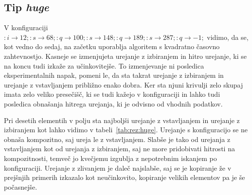 \documentclass[a4paper,oneside,12pt]{article}
\newcommand{\lra}{\ensuremath{\longrightarrow}}
\begin{document}
\subsection{Tip \emph{huge}}
V konfiguraciji $:i \lra 12;:s \lra 68;:q \lra 100;:s \lra 148;:q \lra 189;:s
\lra 287;:q \lra -1;$ vidimo, da se, kot vedno do sedaj, na začetku uporablja algoritem s kvadratno
časovno zahtevnostjo. Kasneje se izmenjujeta urejanje z izbiranjem in hitro
urejanje, ki se na koncu tudi izkaže za učinkovitejše. To izmenjevanje ni
posledica eksperimentalnih napak, pomeni le, da sta takrat urejanje z izbiranjem
in urejanje z vstavljanjem približno enako dobra. Ker sta njuni krivulji zelo
skupaj imata zelo veliko presečišč, ki se tudi kažejo v konfiguraciji in lahko
tudi posledica obnašanja hitrega urejanja, ki je odvisno od vhodnih podatkov.

Pri desetih elementih v polju sta najboljši urejanje z vstavljanjem in urejanje
z izbiranjem kot lahko vidimo v tabeli~\ref{tab:rez:huge}.
Urejanje s konfiguracijo se ne obnaša kompozitno, saj ureja le z
vstavljanjem. Slabše je tako od urejanja z vstavljanjem kot od urejanja z
izbiranjem, saj ne more pridobivati hitrosti na kompozitnosti, temveč jo
kvečjemu izgublja z nepotrebnim iskanjem po konfiguraciji. Urejanje z zlivanjem
je daleč najslabše, saj se je  kopiranje že v prejšnjih primerih izkazalo kot
neučinkovito, kopiranje velikih elementov pa je še počasnejše. 
\end{document}
